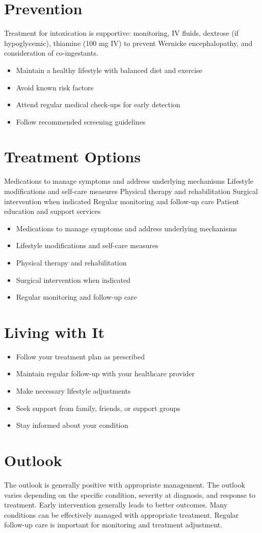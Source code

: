 \section{Prevention}
Treatment for intoxication is supportive: monitoring, IV fluids, dextrose (if hypoglycemic), thiamine (100 mg IV) to prevent Wernicke encephalopathy, and consideration of co-ingestants.

\begin{itemize}[noitemsep]
  \item Maintain a healthy lifestyle with balanced diet and exercise
  \item Avoid known risk factors
  \item Attend regular medical check-ups for early detection
  \item Follow recommended screening guidelines
\end{itemize}
\section{Treatment Options}
Medications to manage symptoms and address underlying mechanisms Lifestyle modifications and self-care measures Physical therapy and rehabilitation Surgical intervention when indicated Regular monitoring and follow-up care Patient education and support services

\begin{itemize}[noitemsep]
  \item Medications to manage symptoms and address underlying mechanisms
  \item Lifestyle modifications and self-care measures
  \item Physical therapy and rehabilitation
  \item Surgical intervention when indicated
  \item Regular monitoring and follow-up care
\end{itemize}
\section{Living with It}
\begin{itemize}[noitemsep]
  \item Follow your treatment plan as prescribed
  \item Maintain regular follow-up with your healthcare provider
  \item Make necessary lifestyle adjustments
  \item Seek support from family, friends, or support groups
  \item Stay informed about your condition
\end{itemize}
\section{Outlook}
The outlook is generally positive with appropriate management. The outlook varies depending on the specific condition, severity at diagnosis, and response to treatment. Early intervention generally leads to better outcomes. Many conditions can be effectively managed with appropriate treatment. Regular follow-up care is important for monitoring and treatment adjustment.
